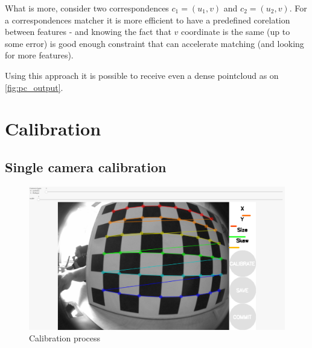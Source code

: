 What is more, consider two correspondences $c_1 = (u_1, v)$ and $c_2 = (u_2, v) $. For a correspondences matcher it is more efficient to have a predefined corelation between features - and knowing the fact that $v$ coordinate is the same (up to some error) is good enough constraint that can accelerate matching (and looking for more features).

Using this approach it is possible to receive even a dense pointcloud as on \autoref{fig:pc_output}.


\section{Calibration}
\subsection{Single camera calibration}

\begin{figure}[h]
    \centering
    \includegraphics[width=.6\textwidth]{graphics/calibration.png}
    \caption{Calibration process}
    \label{fig:calib}
\end{figure}

